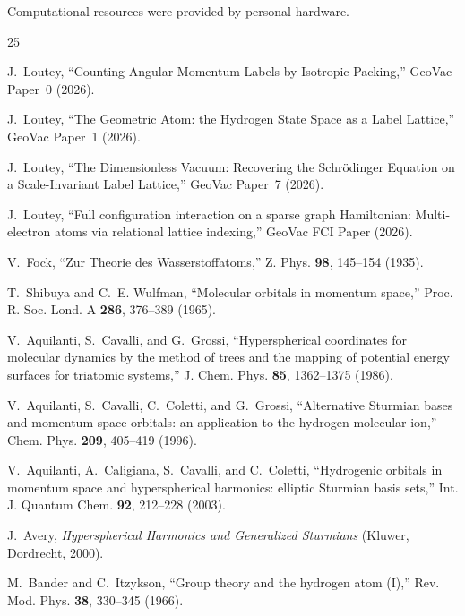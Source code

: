 \documentclass[aps,pra,twocolumn,superscriptaddress,longbibliography]{revtex4-2}
\theoremstyle{remark}
\theoremstyle{plain}
\begin{document}
\begin{acknowledgments}
Computational resources were provided by personal hardware.
\end{acknowledgments}

\begin{thebibliography}{25}

J.~Loutey,
``Counting Angular Momentum Labels by Isotropic Packing,''
GeoVac Paper~0 (2026).

J.~Loutey,
``The Geometric Atom: the Hydrogen State Space as a Label Lattice,''
GeoVac Paper~1 (2026).

J.~Loutey,
``The Dimensionless Vacuum: Recovering the Schr\"odinger Equation
on a Scale-Invariant Label Lattice,''
GeoVac Paper~7 (2026).

J.~Loutey,
``Full configuration interaction on a sparse graph Hamiltonian:
Multi-electron atoms via relational lattice indexing,''
GeoVac FCI Paper (2026).

V.~Fock,
``Zur Theorie des Wasserstoffatoms,''
Z. Phys. \textbf{98}, 145--154 (1935).

T.~Shibuya and C.~E. Wulfman,
``Molecular orbitals in momentum space,''
Proc. R. Soc. Lond. A \textbf{286}, 376--389 (1965).

V.~Aquilanti, S.~Cavalli, and G.~Grossi,
``Hyperspherical coordinates for molecular dynamics by the method
of trees and the mapping of potential energy surfaces for triatomic
systems,''
J. Chem. Phys. \textbf{85}, 1362--1375 (1986).

V.~Aquilanti, S.~Cavalli, C.~Coletti, and G.~Grossi,
``Alternative Sturmian bases and momentum space orbitals: an application
to the hydrogen molecular ion,''
Chem. Phys. \textbf{209}, 405--419 (1996).

V.~Aquilanti, A.~Caligiana, S.~Cavalli, and C.~Coletti,
``Hydrogenic orbitals in momentum space and hyperspherical harmonics:
elliptic Sturmian basis sets,''
Int. J. Quantum Chem. \textbf{92}, 212--228 (2003).

J.~Avery,
\textit{Hyperspherical Harmonics and Generalized Sturmians}
(Kluwer, Dordrecht, 2000).

M.~Bander and C.~Itzykson,
``Group theory and the hydrogen atom (I),''
Rev. Mod. Phys. \textbf{38}, 330--345 (1966).


\end{thebibliography}
\end{document}
